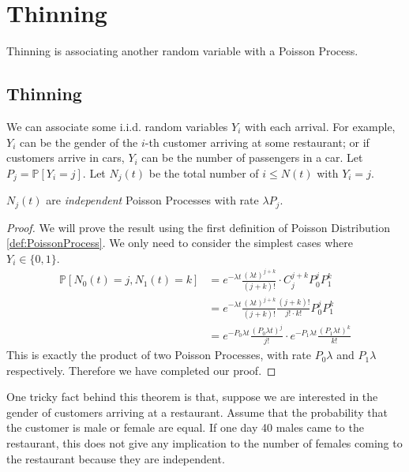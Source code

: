 \section{Thinning}
    Thinning is associating another random variable with a Poisson Process.

    \subsection{Thinning}
        We can associate some i.i.d. random variables $Y_i$ with each arrival. For example, $Y_i$ can be the gender of the $i$-th customer arriving at some restaurant; or if customers arrive in cars, $Y_i$ can be the number of passengers in a car. Let $P_j = \mathbb{P}[Y_i = j]$. Let $N_j(t)$ be the total number of $i \le N(t)$ with $Y_i = j$.

        \begin{theorem}\label{thm:ThinningOfPoissonProcess}
            $N_j(t)$ are \emph{independent} Poisson Processes with rate $\lambda P_j$.
        \end{theorem}
        \begin{proof}
            We will prove the result using the first definition of Poisson Distribution \ref{def:PoissonProcess}. We only need to consider the simplest cases where $Y_i \in \{0,1\}$.
            \begin{align*}
                \mathbb{P}[N_0(t) = j, N_1(t) = k] &= e^{-\lambda t}\frac{(\lambda t)^{j+k}}{(j+k)!}\cdot C^{j+k}_j P_0^j P_1^k \\
                &= e^{-\lambda t}\frac{(\lambda t)^{j+k}}{(j+k)!}\frac{(j+k)!}{j! \cdot k!}P_0^j P_1^k\\
                &= e^{-P_0\lambda t}\frac{(P_0\lambda t)^j}{j!} \cdot e^{-P_1\lambda t} \frac{(P_1 \lambda t)^k}{k!}
            \end{align*}
            This is exactly the product of two Poisson Processes, with rate $P_0\lambda$ and $P_1\lambda$ respectively. Therefore we have completed our proof.
        \end{proof}
        \begin{remark}
            One tricky fact behind this theorem is that, suppose we are interested in the gender of customers arriving at a restaurant. Assume that the probability that the customer is male or female are equal. If one day 40 males came to the restaurant, this does not give any implication to the number of females coming to the restaurant because they are independent.
        \end{remark}

